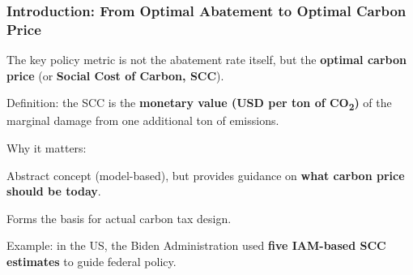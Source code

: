 \documentclass[xcolor=x11names,compress,aspectratio=169]{beamer}%
\makeatletter
\renewenvironment{itemize}{\begin{compactitemize}[<+-| alert@+>]}{\end{compactitemize}}
\makeatother
\begin{document}
\begin{frame}%
%

\frametitle{Introduction: From Optimal Abatement to Optimal Carbon Price}%


\begin{itemize}
\item The key policy metric is not the abatement rate itself, but the
\textbf{optimal carbon price} (or \textbf{Social Cost of Carbon, SCC}).
\medskip

\item Definition: the SCC is the \textbf{monetary value (USD per ton of
CO\textsubscript{2})} of the marginal damage from one additional ton of
emissions. \medskip

\item Why it matters:

\begin{itemize}
\item Abstract concept (model-based), but provides guidance on \textbf{what
carbon price should be today}.

\item Forms the basis for actual carbon tax design.

\item Example: in the US, the Biden Administration used \textbf{five IAM-based
SCC estimates} to guide federal policy.
\end{itemize}
\end{itemize}

%

\transboxout
\end{frame}%
%
\end{document}
